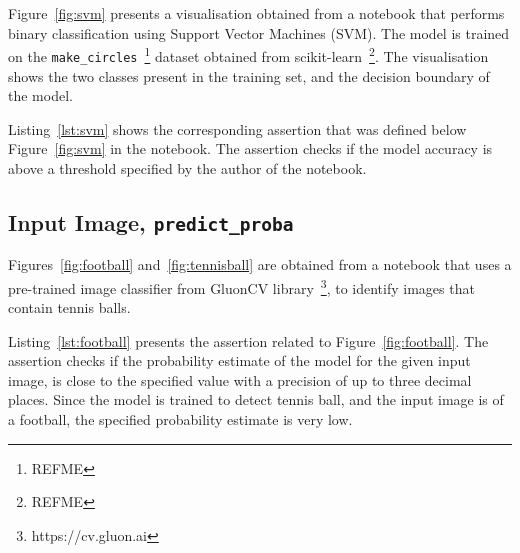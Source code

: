 \documentclass[acmsmall,screen,review,anonymous]{acmart}
\begin{document}

Figure~\ref{fig:svm} presents a visualisation obtained from a notebook that performs binary classification using Support Vector Machines (SVM). The model is trained on the \texttt{make\_circles}~\footnote{REFME} dataset obtained from scikit-learn~\footnote{REFME}. The visualisation shows the two classes present in the training set, and the decision boundary of the model.

Listing~\ref{lst:svm} shows the corresponding assertion that was defined below Figure~\ref{fig:svm} in the notebook. The assertion checks if the model accuracy is above a threshold specified by the author of the notebook.


\subsection{Input Image, \texttt{predict\_proba}}

Figures~\ref{fig:football} and~\ref{fig:tennisball} are obtained from a notebook that uses a pre-trained image classifier from GluonCV library~\footnote{https://cv.gluon.ai}, to identify images that contain tennis balls.

Listing~\ref{lst:football} presents the assertion related to Figure~\ref{fig:football}. The assertion checks if the probability estimate of the model for the given input image, is close to the specified value with a precision of up to three decimal places. Since the model is trained to detect tennis ball, and the input image is of a football, the specified probability estimate is very low.
\end{document}

